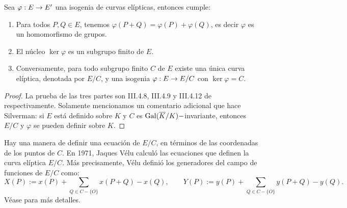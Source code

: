 \begin{thm}\label{thm:kernel-isogenias}
	Sea $\varphi: E\rightarrow E'$ una isogenia de curvas elípticas, entonces cumple:
	\begin{enumerate}[label=\roman*)]
		\item Para todos $P,Q\in E$, tenemos $\varphi(P+Q)=\varphi(P)+\varphi(Q)$, es decir $\varphi$ es un homomorfismo de grupos.
		\item\label{inc:nucleo-finito} El núcleo $\ker\varphi$ es un subgrupo finito de $E$.
		\item Conversamente, para todo subgrupo finito $C$ de $E$ existe una única curva elíptica, denotada por $E/C$, y una isogenia $\varphi :E\rightarrow E/C$ con $\ker\varphi =C$. 
	\end{enumerate}
\end{thm}
\begin{proof}
	La  prueba de las tres partes son III.4.8, III.4.9 y III.4.12 de \cite{SilvermanTAOEC} respectivamente. Solamente mencionamos un comentario adicional que hace Silverman: si $E$ está definido sobre $K$ y $C$ es $\mathrm{Gal}(\overline{K}/K)-$invariante, entonces $E/C$ y $\varphi$ se pueden definir sobre $K$.
\end{proof}

\begin{nota}
	Hay una manera de definir una ecuación de $E/C$, en términos de las coordenadas de los puntos de $C$. En 1971, Jaques Vélu calculó las ecuaciones que definen la curva elíptica $E/C$. Más precisamente, Vélu definió los generadores del campo de funciones de $E/C$ como:
	\[
		X(P):=x(P)+\sum_{Q\in C-\{O\}} x(P+Q)-x(Q),\qquad Y(P):=y(P)+\sum_{Q\in C-\{O\}} y(P+Q)-y(Q).
	\]
Véase \cite{VeluIECE} para más detalles.

\end{nota}

